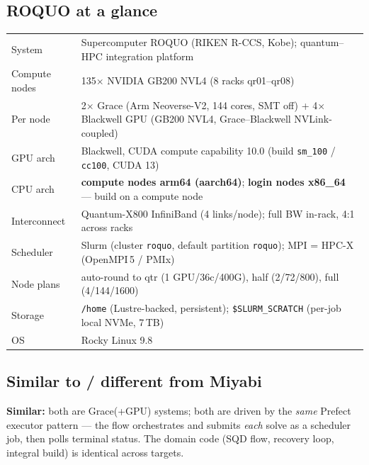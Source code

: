\documentclass[11pt]{article}
\begin{document}
\subsection{ROQUO at a glance}
\begin{longtable}{@{}p{}p{}@{}}
\toprule
System & Supercomputer ROQUO (RIKEN R-CCS, Kobe); quantum--HPC integration platform \\
Compute nodes & 135$\times$ NVIDIA GB200 NVL4 (8 racks qr01--qr08) \\
Per node & 2$\times$ Grace (Arm Neoverse-V2, 144 cores, SMT off) + 4$\times$ Blackwell GPU
           (GB200 NVL4, Grace--Blackwell NVLink-coupled) \\
GPU arch & Blackwell, CUDA compute capability 10.0 (build \texttt{sm\_100} / \texttt{cc100}, CUDA 13) \\
CPU arch & \textbf{compute nodes arm64 (aarch64)}; \textbf{login nodes x86\_64} --- build on a compute node \\
Interconnect & Quantum-X800 InfiniBand (4 links/node); full BW in-rack, 4:1 across racks \\
Scheduler & Slurm (cluster \texttt{roquo}, default partition \texttt{roquo}); MPI = HPC-X (OpenMPI\,5 / PMIx) \\
Node plans & auto-round to qtr (1 GPU/36c/400G), half (2/72/800), full (4/144/1600) \\
Storage & \texttt{/home} (Lustre-backed, persistent); \texttt{\$SLURM\_SCRATCH} (per-job local NVMe, 7\,TB) \\
OS & Rocky Linux 9.8 \\
\bottomrule
\end{longtable}

\subsection{Similar to / different from Miyabi}
\textbf{Similar:} both are Grace(+GPU) systems; both are driven by the \emph{same} Prefect
executor pattern --- the flow orchestrates and submits \emph{each} solve as a scheduler job,
then polls terminal status. The domain code (SQD flow, recovery loop, integral build) is
identical across targets.
\end{document}
